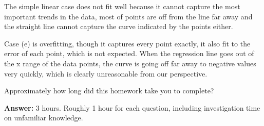 \documentclass[submit]{harvardml}
\begin{document}
The simple linear case does not fit well because it cannot capture the most important trends in the data, most of points are off from the line far away and the straight line cannot capture the curve indicated by the points either.

Case (e) is overfitting, though it captures every point exactly, it also fit to the error of each point, which is not expected. When the regression line goes out of the x range of the data points, the curve is going off far away to negative values very quickly, which is clearly unreasonable from our perspective.

\newpage
\begin{problem}[Calibration, 1pt]
Approximately how long did this homework take you to complete?
\end{problem}
\textbf{Answer:}
3 hours. Roughly 1 hour for each question, including investigation time on unfamiliar knowledge. 
\end{document}
